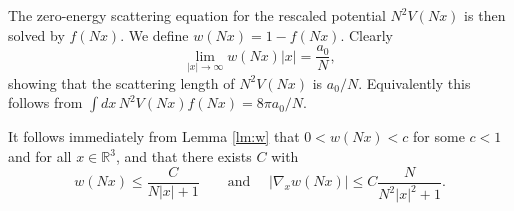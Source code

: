 \documentclass[11pt,a4paper]{article}
\newcommand{\done}{}
\newcommand{\bR}{{\mathbb R}}
\newcommand{\di}{{d}}		%
\newcommand{\ph}{\varphi_t^{(N)}}	%
\begin{document}
The zero-energy scattering equation for the rescaled potential $N^2 V (Nx)$ is then solved by $f(Nx)$. We define $w(Nx) = 1- f(Nx)$. Clearly 
\[ \lim_{|x| \to \infty} w(Nx) |x| = \frac{a_0}{N} ,\]
showing that the scattering length of $N^2 V(Nx)$ is $a_0/N$. Equivalently this follows from $\int \di x\, N^2V(Nx)f(Nx) = 8\pi a_0/N$.\done

It follows immediately from Lemma \ref{lm:w} that $0 < w(Nx) < c$ for some $c <1$ and for all $x \in \bR^3$, and that there exists $C$ with 
\begin{equation}\label{eq:wN-bd} w(Nx) \leq \frac{C}{N|x| + 1} \qquad \text{and } \quad |\nabla_x w(Nx)| \leq C \frac{N}{N^2 |x|^2 + 1}. \end{equation}

\end{document}
